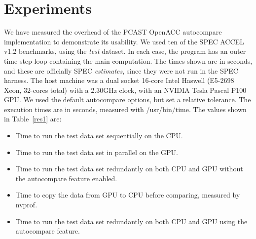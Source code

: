 \section{Experiments}

We have measured the overhead of the PCAST OpenACC autocompare implementation to demonstrate its usability.
We used ten of the SPEC ACCEL v1.2 benchmarks, using the \emph{test} dataset.
In each case, the program has an outer time step loop containing the main computation.
The times shown are in seconds, and these are officially SPEC \emph{estimates}, since they were not run in the SPEC harness.
The host machine was a dual socket 16-core Intel Haswell (E5-2698 Xeon, 32-cores total) with a 2.30GHz clock, with an NVIDIA Tesla Pascal P100 GPU.
We used the default autocompare options, but set a relative tolerance.
The execution times are in seconds, measured with /usr/bin/time.
The values shown in Table~\ref{res1} are:
\begin{itemize}
\item Time to run the test data set sequentially on the CPU.
\item Time to run the test data set in parallel on the GPU.
\item Time to run the test data set redundantly on both CPU and GPU without the autocompare feature enabled.
\item Time to copy the data from GPU to CPU before comparing, measured by nvprof.
\item Time to run the test data set redundantly on both CPU and GPU using the autocompare feature.
\end{itemize}




